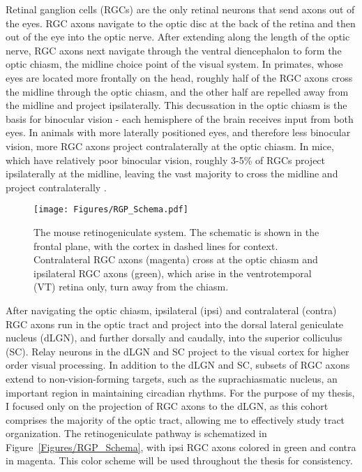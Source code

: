 Retinal ganglion cells (RGCs) are the only retinal neurons that send axons out of the eyes.
RGC axons navigate to the optic disc at the back of the retina and then out of the eye into the optic nerve.
After extending along the length of the optic nerve, RGC axons next navigate through the ventral diencephalon to form the optic chiasm, the midline choice point of the visual system.
In primates, whose eyes are located more frontally on the head, roughly half of the RGC axons cross the midline through the optic chiasm, and the other half are repelled away from the midline and project ipsilaterally.
This decussation in the optic chiasm is the basis for binocular vision - each hemisphere of the brain receives input from both eyes.
In animals with more laterally positioned eyes, and therefore less binocular vision, more RGC axons project contralaterally at the optic chiasm.
In mice, which have relatively poor binocular vision, roughly 3-5\% of RGCs project ipsilaterally at the midline, leaving the vast majority to cross the midline and project contralaterally \cite{petros2008retinal}.

\begin{figure}[hbtp]
    \begin{center}
        \texttt{[image: Figures/RGP\_Schema.pdf]}
        \caption[The mouse retinogeniculate system.]
        {The mouse retinogeniculate system.
        The schematic is shown in the frontal plane, with the cortex in dashed lines for context.
        Contralateral RGC axons (magenta) cross at the optic chiasm and ipsilateral RGC axons (green), which arise in the ventrotemporal (VT) retina only, turn away from the chiasm.}
        \label{Figures/RGPSchema}
    \end{center}
\end{figure}
After navigating the optic chiasm, ipsilateral (ipsi) and contralateral (contra) RGC axons run in the optic tract and project into the dorsal lateral geniculate nucleus (dLGN), and further dorsally and caudally, into the superior colliculus (SC).
Relay neurons in the dLGN and SC project to the visual cortex for higher order visual processing.
In addition to the dLGN and SC, subsets of RGC axons extend to non-vision-forming targets, such as the suprachiasmatic nucleus, an important region in maintaining circadian rhythms.
For the purpose of my thesis, I focused only on the projection of RGC axons to the dLGN, as this cohort comprises the majority of the optic tract, allowing me to effectively study tract organization.
The retinogeniculate pathway is schematized in Figure~\ref{Figures/RGP_Schema}, with ipsi RGC axons colored in green and contra in magenta.
This color scheme will be used throughout the thesis for consistency.


